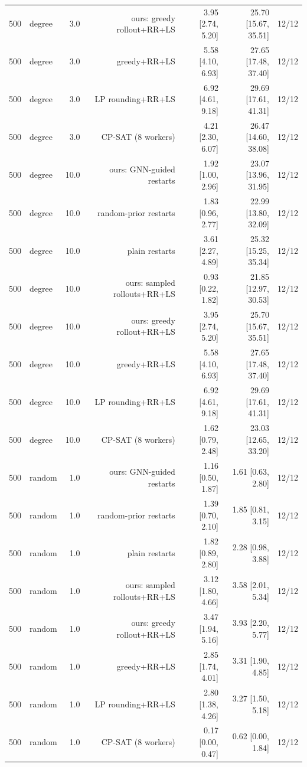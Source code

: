 \begin{table}[t]
\begin{tabular}{llrrrrr}
500 & degree & 3.0 & ours: greedy rollout+RR+LS & 3.95 [2.74, 5.20] & 25.70 [15.67, 35.51] & 12/12 \\
500 & degree & 3.0 & greedy+RR+LS & 5.58 [4.10, 6.93] & 27.65 [17.48, 37.40] & 12/12 \\
500 & degree & 3.0 & LP rounding+RR+LS & 6.92 [4.61, 9.18] & 29.69 [17.61, 41.31] & 12/12 \\
500 & degree & 3.0 & CP-SAT (8 workers) & 4.21 [2.30, 6.07] & 26.47 [14.60, 38.08] & 12/12 \\
500 & degree & 10.0 & ours: GNN-guided restarts & 1.92 [1.00, 2.96] & 23.07 [13.96, 31.95] & 12/12 \\
500 & degree & 10.0 & random-prior restarts & 1.83 [0.96, 2.77] & 22.99 [13.80, 32.09] & 12/12 \\
500 & degree & 10.0 & plain restarts & 3.61 [2.27, 4.89] & 25.32 [15.25, 35.34] & 12/12 \\
500 & degree & 10.0 & ours: sampled rollouts+RR+LS & 0.93 [0.22, 1.82] & 21.85 [12.97, 30.53] & 12/12 \\
500 & degree & 10.0 & ours: greedy rollout+RR+LS & 3.95 [2.74, 5.20] & 25.70 [15.67, 35.51] & 12/12 \\
500 & degree & 10.0 & greedy+RR+LS & 5.58 [4.10, 6.93] & 27.65 [17.48, 37.40] & 12/12 \\
500 & degree & 10.0 & LP rounding+RR+LS & 6.92 [4.61, 9.18] & 29.69 [17.61, 41.31] & 12/12 \\
500 & degree & 10.0 & CP-SAT (8 workers) & 1.62 [0.79, 2.48] & 23.03 [12.65, 33.20] & 12/12 \\
500 & random & 1.0 & ours: GNN-guided restarts & 1.16 [0.50, 1.87] & 1.61 [0.63, 2.80] & 12/12 \\
500 & random & 1.0 & random-prior restarts & 1.39 [0.70, 2.10] & 1.85 [0.81, 3.15] & 12/12 \\
500 & random & 1.0 & plain restarts & 1.82 [0.89, 2.80] & 2.28 [0.98, 3.88] & 12/12 \\
500 & random & 1.0 & ours: sampled rollouts+RR+LS & 3.12 [1.80, 4.66] & 3.58 [2.01, 5.34] & 12/12 \\
500 & random & 1.0 & ours: greedy rollout+RR+LS & 3.47 [1.94, 5.16] & 3.93 [2.20, 5.77] & 12/12 \\
500 & random & 1.0 & greedy+RR+LS & 2.85 [1.74, 4.01] & 3.31 [1.90, 4.85] & 12/12 \\
500 & random & 1.0 & LP rounding+RR+LS & 2.80 [1.38, 4.26] & 3.27 [1.50, 5.18] & 12/12 \\
500 & random & 1.0 & CP-SAT (8 workers) & 0.17 [0.00, 0.47] & 0.62 [0.00, 1.84] & 12/12 \\

\end{tabular}
\end{table}
